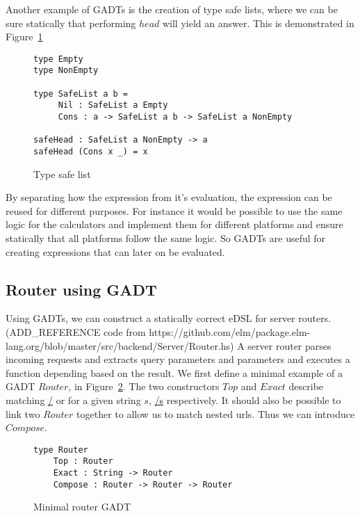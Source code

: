 Another example of GADTs is the creation of type safe lists, where we can be
sure statically that performing $head$ will yield an answer. This is
demonstrated in Figure~\ref{safelist}

\begin{figure}[H]
    \begin{lstlisting}
type Empty
type NonEmpty

type SafeList a b =
     Nil : SafeList a Empty
     Cons : a -> SafeList a b -> SafeList a NonEmpty

safeHead : SafeList a NonEmpty -> a
safeHead (Cons x _) = x
    \end{lstlisting}
    \caption{Type safe list}
    \label{safelist}
\end{figure}

By separating how the expression from it's evaluation, the expression can be
reused for different purposes. For instance it would be possible to use the same
logic for the calculators and implement them for different platforms and ensure
statically that all platforms follow the same logic. So GADTs are useful for
creating expressions that can later on be evaluated.

\subsection{Router using GADT}

Using GADTs, we can construct a statically correct eDSL for server
routers.(ADD\_REFERENCE code from
https://github.com/elm/package.elm-lang.org/blob/master/src/backend/Server/Router.hs)
A server router parses incoming requests and extracts query parameters and
parameters and executes a function depending based on the result. We first
define a minimal example of a GADT $Router$, in Figure~\ref{routergadtminimal}.
The two constructors $Top$ and $Exact$ describe matching \url{/} or for a given
string $s$, \url{/s} respectively. It should also be possible to link two
$Router$ together to allow us to match nested urls. Thus we can introduce
$Compose$.

\begin{figure}[H]
    \begin{lstlisting}
type Router 
    Top : Router 
    Exact : String -> Router 
    Compose : Router -> Router -> Router
    \end{lstlisting}
    \caption{Minimal router GADT}
    \label{routergadtminimal}
\end{figure}


